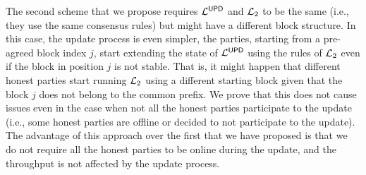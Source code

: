 The second scheme that we propose requires $\mathcal{L}^\mathsf{UPD}$ and $\mathcal{L}_2$ to be the same (i.e.,  they use the same consensus rules) but might have a different block structure. In this case, the update process is even simpler,
the parties, starting from a pre-agreed block index $j$, start extending the state of  $\mathcal{L}^\mathsf{UPD}$ using the rules of
$\mathcal{L}_2$ even if the block in position $j$ is not stable. That is, it might happen that different honest parties 
start running $\mathcal{L}_2$ using a different starting block given that the block $j$ does not belong to the common prefix. We prove that this does not cause issues even in the case when not all the honest parties participate 
to the update (i.e., some honest parties are offline or decided to not participate to the update). 
The advantage of this approach over the first that we have proposed is that we do not require all the honest parties to be online during the update, and the throughput is not affected by the update process. 


